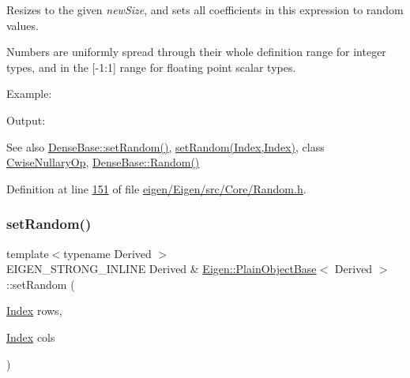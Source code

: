 Resizes to the given {\itshape new\+Size}, and sets all coefficients in this expression to random values.

Numbers are uniformly spread through their whole definition range for integer types, and in the \mbox{[}-\/1\+:1\mbox{]} range for floating point scalar types.

Example\+: 
\begin{DoxyCodeInclude}
\end{DoxyCodeInclude}
 Output\+: 
\begin{DoxyVerbInclude}
\end{DoxyVerbInclude}


\begin{DoxySeeAlso}{See also}
\hyperlink{group___core___module_ac476e5852129ba32beaa1a8a3d7ee0db}{Dense\+Base\+::set\+Random()}, \hyperlink{class_eigen_1_1_plain_object_base_a2139f7c1a6711ebd86c4ff6378f5e775}{set\+Random(\+Index,\+Index)}, class \hyperlink{group___core___module_class_eigen_1_1_cwise_nullary_op}{Cwise\+Nullary\+Op}, \hyperlink{group___core___module_ae814abb451b48ed872819192dc188c19}{Dense\+Base\+::\+Random()} 
\end{DoxySeeAlso}


Definition at line \hyperlink{eigen_2_eigen_2src_2_core_2_random_8h_source_l00151}{151} of file \hyperlink{eigen_2_eigen_2src_2_core_2_random_8h_source}{eigen/\+Eigen/src/\+Core/\+Random.\+h}.

\mbox{\label{class_eigen_1_1_plain_object_base_a2139f7c1a6711ebd86c4ff6378f5e775}} 
\subsubsection{\texorpdfstring{set\+Random()}{setRandom()}\hspace{0.1cm}{\footnotesize\ttfamily [2/2]}}
{\footnotesize\ttfamily template$<$typename Derived $>$ \\
E\+I\+G\+E\+N\+\_\+\+S\+T\+R\+O\+N\+G\+\_\+\+I\+N\+L\+I\+NE Derived \& \hyperlink{class_eigen_1_1_plain_object_base}{Eigen\+::\+Plain\+Object\+Base}$<$ Derived $>$\+::set\+Random (\begin{DoxyParamCaption}\item[{\hyperlink{namespace_eigen_a62e77e0933482dafde8fe197d9a2cfde}{Index}}]{rows,  }\item[{\hyperlink{namespace_eigen_a62e77e0933482dafde8fe197d9a2cfde}{Index}}]{cols }\end{DoxyParamCaption})}

